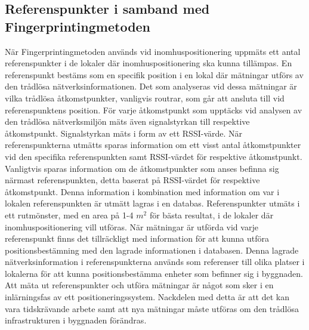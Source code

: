 \documentclass[swedish, a4paper,12pt]{article}
\begin{document}
\subsection{Referenspunkter i samband med Fingerprintingmetoden}\label{referenspunkter}
När Fingerprintingmetoden används vid inomhuspositionering uppmäts ett antal referenspunkter i de lokaler där inomhuspositionering ska kunna tillämpas\cite{yiu2017wireless}\cite{IP1}.
En referenspunkt bestäms som en specifik position i en lokal där mätningar utförs av den trådlösa nätverksinformationen. Det som analyseras vid dessa mätningar är vilka trådlösa åtkomstpunkter, vanligvis routrar, som går att ansluta till vid referenspunktens position. För varje åtkomstpunkt som upptäcks vid analysen av den trådlösa nätverksmiljön mäts även signalstyrkan till respektive åtkomstpunkt. Signalstyrkan mäts i form av ett RSSI-värde. När referenspunkterna utmätts sparas information om ett visst antal åtkomstpunkter vid den specifika referenspunkten samt RSSI-värdet för respektive åtkomstpunkt\cite{IP1}. Vanligtvis sparas information om de åtkomstpunkter som anses befinna sig närmast referenspunkten, detta baserat på RSSI-värdet för respektive åtkomstpunkt\cite{IP1}.
Denna information i kombination med information om var i lokalen referenspunkten är utmätt lagras i en databas. Referenspunkter utmäts i ett rutmönster, med en area på 1-4 $m^2$ för bästa resultat\cite{yiu2017wireless}, i de lokaler där inomhuspositionering vill utföras\cite{IP1}. När mätningar är utförda vid varje referenspunkt finns det tillräckligt med information för att kunna utföra positionsbestämning med den lagrade informationen i databasen. Denna lagrade nätverksinformation i referenspunkterna används som referenser till olika platser i lokalerna för att kunna positionsbestämma enheter som befinner sig i byggnaden\cite{yiu2017wireless}\cite{IP1}.
Att mäta ut referenspunkter och utföra mätningar är något som sker i en inlärningsfas av ett positioneringssystem\cite{tian2013fingerprint}. Nackdelen med detta är att det kan vara tidskrävande arbete samt att nya mätningar måste utföras om den trådlösa infrastrukturen i byggnaden förändras\cite{IP1}.
\end{document}
